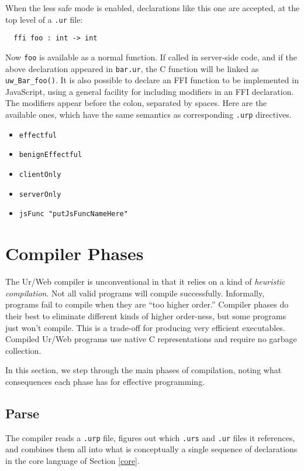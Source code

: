 \documentclass{article}
\begin{document}
When the less safe mode is enabled, declarations like this one are accepted, at the top level of a \texttt{.ur} file:
\begin{verbatim}
  ffi foo : int -> int
\end{verbatim}

Now \texttt{foo} is available as a normal function.  If called in server-side code, and if the above declaration appeared in \texttt{bar.ur}, the C function will be linked as \texttt{uw\_Bar\_foo()}.  It is also possible to declare an FFI function to be implemented in JavaScript, using a general facility for including modifiers in an FFI declaration.  The modifiers appear before the colon, separated by spaces.  Here are the available ones, which have the same semantics as corresponding \texttt{.urp} directives.
\begin{itemize}
\item \texttt{effectful}
\item \texttt{benignEffectful}
\item \texttt{clientOnly}
\item \texttt{serverOnly}
\item \texttt{jsFunc "putJsFuncNameHere"}
\end{itemize}


\section{Compiler Phases}

The Ur/Web compiler is unconventional in that it relies on a kind of \emph{heuristic compilation}.  Not all valid programs will compile successfully.  Informally, programs fail to compile when they are ``too higher order.''  Compiler phases do their best to eliminate different kinds of higher order-ness, but some programs just won't compile.  This is a trade-off for producing very efficient executables.  Compiled Ur/Web programs use native C representations and require no garbage collection.

In this section, we step through the main phases of compilation, noting what consequences each phase has for effective programming.

\subsection{Parse}

The compiler reads a \texttt{.urp} file, figures out which \texttt{.urs} and \texttt{.ur} files it references, and combines them all into what is conceptually a single sequence of declarations in the core language of Section \ref{core}.
\end{document}
